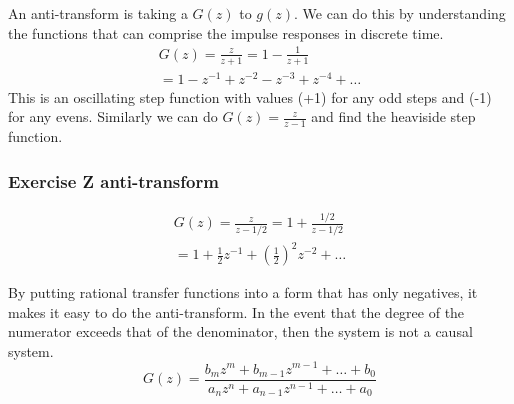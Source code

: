 \documentclass[11pt]{article}
\begin{document}
An anti-transform is taking a $G(z)$ to $g(z)$.
We can do this by understanding the functions that can comprise the impulse responses in discrete time.
\begin{gather}
    G(z) = \frac{z}{z+1} = 1 - \frac{1}{z+1} \\
    = 1 - z^{-1} + z^{-2} - z^{-3} + z^{-4} + \dots
\end{gather}
This is an oscillating step function with values (+1) for any odd steps and (-1) for any evens.
Similarly we can do $G(z) = \frac{z}{z-1}$ and find the heaviside step function.

\subsubsection{Exercise Z anti-transform}
\begin{gather}
    G(z) = \frac{z}{z-1/2} = 1 + \frac{1/2}{z-1/2} \\
    = 1 + \frac{1}{2} z^{-1} + (\frac{1}{2})^2 z^{-2} + \dots
\end{gather}

By putting rational transfer functions into a form that has only negatives, it makes it easy to do the anti-transform.
In the event that the degree of the numerator exceeds that of the denominator, then the system is not a causal system.
\begin{equation}
    G(z) = \frac{b_m z^m + b_{m-1} z^{m-1} + \dots + b_0}{a_n z^{n} + a_{n-1} z^{n-1} + \dots + a_0}
\end{equation}




\end{document}
